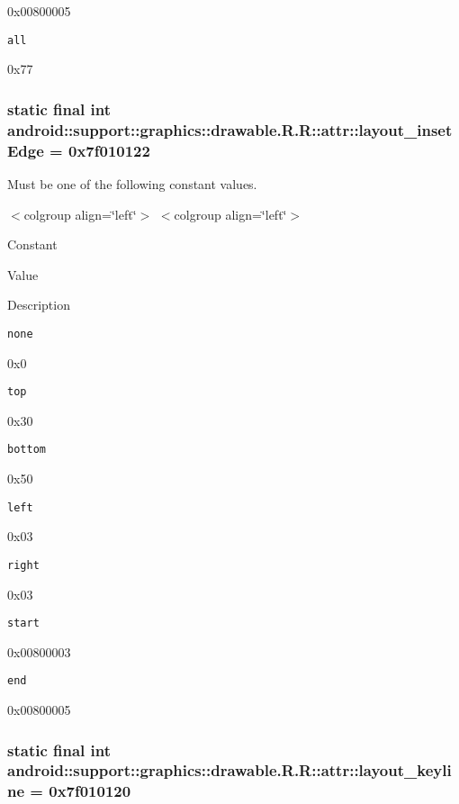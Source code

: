 0x00800005

{\tt all}

0x77\hypertarget{classandroid_1_1support_1_1graphics_1_1drawable_1_1_r_1_1attr_ca729f0e3b4a28d3495432b0469e6cd7}{
\subsubsection[{layout\_\-insetEdge}]{\setlength{\rightskip}{0pt plus 5cm}static final int android::support::graphics::drawable.R.R::attr::layout\_\-insetEdge = 0x7f010122}}
\label{classandroid_1_1support_1_1graphics_1_1drawable_1_1_r_1_1attr_ca729f0e3b4a28d3495432b0469e6cd7}


Must be one of the following constant values. \begin{TabularC}{0}
\hline
\end{TabularC}
$<$colgroup align=\char`\"{}left\char`\"{}$>$ $<$colgroup align=\char`\"{}left\char`\"{}$>$ 

Constant

Value

Description 

{\tt none}

0x0

{\tt top}

0x30

{\tt bottom}

0x50

{\tt left}

0x03

{\tt right}

0x03

{\tt start}

0x00800003

{\tt end}

0x00800005\hypertarget{classandroid_1_1support_1_1graphics_1_1drawable_1_1_r_1_1attr_d23e2bc2a00fccadc5e9c92cb0c6a890}{
\subsubsection[{layout\_\-keyline}]{\setlength{\rightskip}{0pt plus 5cm}static final int android::support::graphics::drawable.R.R::attr::layout\_\-keyline = 0x7f010120}}
\label{classandroid_1_1support_1_1graphics_1_1drawable_1_1_r_1_1attr_d23e2bc2a00fccadc5e9c92cb0c6a890}


